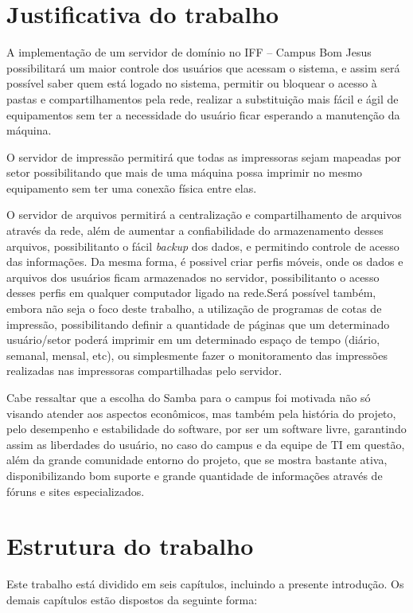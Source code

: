 \section{Justificativa do trabalho}

A implementação de um servidor de domínio no IFF – Campus Bom Jesus possibilitará um maior controle dos usuários que acessam o sistema, e assim será possível saber quem está logado no sistema, permitir ou bloquear o acesso à pastas e compartilhamentos pela rede, realizar a substituição mais fácil e ágil de equipamentos sem ter a necessidade do usuário ficar esperando a manutenção da máquina.

O servidor de impressão permitirá que todas as impressoras sejam mapeadas por setor possibilitando que mais de uma máquina possa imprimir no mesmo equipamento sem ter uma conexão física entre elas.

O servidor de arquivos permitirá a centralização e compartilhamento de arquivos através da rede, além de aumentar a confiabilidade do armazenamento desses arquivos, possibilitanto o fácil \textit{backup} dos dados, e permitindo controle de acesso das informações. Da mesma forma, é possivel criar perfis móveis, onde os dados e arquivos dos usuários ficam armazenados no servidor, possibilitanto o acesso desses perfis em qualquer computador ligado na rede.Será possível também, embora não seja o foco deste trabalho, a utilização de programas de cotas de impressão, possibilitando definir a quantidade de páginas que um determinado usuário/setor poderá imprimir em um determinado espaço de tempo (diário, semanal, mensal, etc), ou simplesmente fazer o monitoramento das impressões realizadas nas impressoras compartilhadas pelo servidor.

Cabe ressaltar que a escolha do Samba para o campus foi motivada não só visando atender aos aspectos econômicos, mas também pela história do projeto, pelo desempenho e estabilidade do software, por ser um software livre, garantindo assim as liberdades do usuário, no caso do campus e da equipe de TI em questão, além da grande comunidade entorno do projeto, que se mostra bastante ativa, disponibilizando bom suporte e grande quantidade de informações através de fóruns e sites especializados.

\section{Estrutura do trabalho}

Este trabalho está dividido em seis capítulos, incluindo a presente introdução. Os demais capítulos estão dispostos da seguinte forma:

